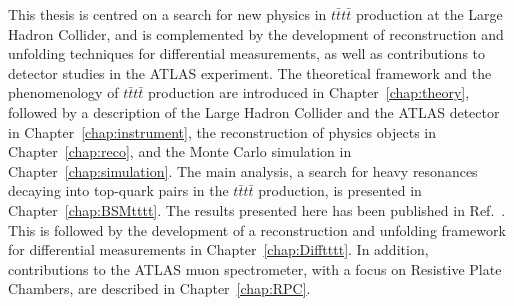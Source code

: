 This thesis is centred on a search for new physics in $t\bar{t}t\bar{t}$ production at the Large Hadron Collider, and is complemented by the development of reconstruction and unfolding techniques for differential measurements, as well as contributions to detector studies in the ATLAS experiment. 
The theoretical framework and the phenomenology of $t\bar{t}t\bar{t}$ production are introduced in Chapter~\ref{chap:theory},
followed by a description of the Large Hadron Collider and the ATLAS detector in Chapter~\ref{chap:instrument}, 
the reconstruction of physics objects in Chapter~\ref{chap:reco}, 
and the Monte Carlo simulation in Chapter~\ref{chap:simulation}. 
The main analysis, a search for heavy resonances decaying into top-quark pairs in the $t\bar{t}t\bar{t}$ production, is presented in Chapter~\ref{chap:BSMtttt}. 
The results presented here has been published in Ref.~\cite{ATLAS_tttt_2025_EPJC}.
This is followed by the development of a reconstruction and unfolding framework for differential measurements in Chapter~\ref{chap:Difftttt}. 
In addition, contributions to the ATLAS muon spectrometer, with a focus on Resistive Plate Chambers, are described in Chapter~\ref{chap:RPC}. 
